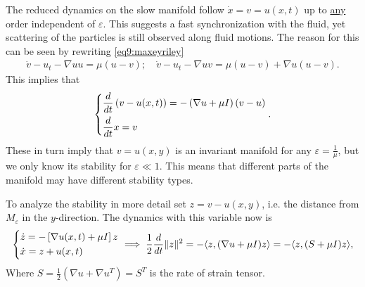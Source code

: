 \begin{ex}
The reduced dynamics on the slow manifold follow $\dot{x}=v=u(x,t)$ up to \underline{any} order independent of $\varepsilon$. This suggests a fast synchronization with the fluid, yet scattering of the particles is still observed along fluid motions. The reason for this can be seen by rewriting \eqref{eq9:maxeyriley}
\begin{align}
	\dot{v} - u_{t} - \nabla u u = \mu (u-v);\quad \dot{v} - u_{t} - \nabla u v = \mu (u-v) + \nabla u(u-v).
\end{align}
This implies that
\begin{align}
	\begin{dcases}
		\frac{d}{dt}\left(v - u(x,t)\right) = - \left( \nabla u + \mu I \right) \left( v - u \right) \\
		\frac{d}{dt} x = v
	\end{dcases}
	.
\end{align}
These in turn imply that $v=u(x,y)$ is an invariant manifold for any $\varepsilon = \frac{1}{\mu }$, but we only know its stability for $\varepsilon \ll 1$. 
This means that different parts of the manifold may have different stability types. 

To analyze the stability in more detail set $z= v- u(x,y)$, i.e. the distance from $ M_{\varepsilon} $ in the $y$-direction. The dynamics with this variable now is 
\begin{align}
	\begin{dcases}
		\dot{z} = - \left[ \nabla u(x,t) + \mu I \right] z \\
		\dot{x} = z + u(x,t)
	\end{dcases}
	\implies \frac{1}{2}\frac{d}{dt}\|z\|^{2} = - \langle z, (\nabla u + \mu I) z \rangle = - \langle z, (S + \mu I) z \rangle,
\end{align}
Where $S = \frac{1}{2} \left( \nabla u + \nabla u^{T} \right) = S^{T}$ is the rate of strain tensor.


\end{ex}
